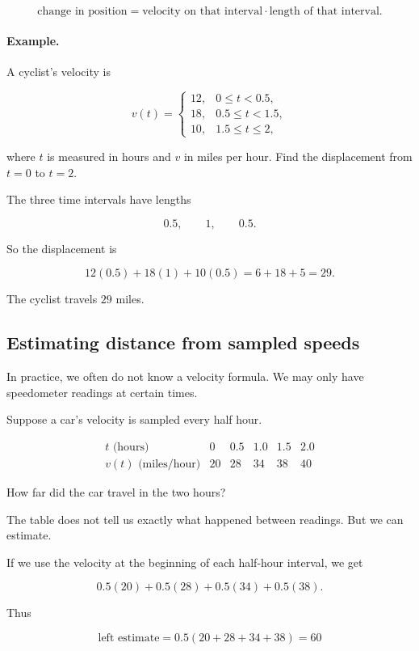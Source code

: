 \[
\text{change in position}
=
\text{velocity on that interval}\cdot\text{length of that interval}.
\]

\paragraph{Example.}
A cyclist's velocity is

\[
v(t)=
\begin{cases}
12, & 0\le t<0.5,\\
18, & 0.5\le t<1.5,\\
10, & 1.5\le t\le 2,
\end{cases}
\]

where \(t\) is measured in hours and \(v\) in miles per hour.  Find the displacement
from \(t=0\) to \(t=2\).

The three time intervals have lengths

\[
0.5,\qquad 1,\qquad 0.5.
\]

So the displacement is

\[
12(0.5)+18(1)+10(0.5)=6+18+5=29.
\]

The cyclist travels \(29\) miles.

\subsection{Estimating distance from sampled speeds}
\label{subsec:estimating-distance-from-sampled-speeds}

In practice, we often do not know a velocity formula.  We may only have speedometer
readings at certain times.

Suppose a car's velocity is sampled every half hour.

\[
\begin{array}{c|ccccc}
t\text{ (hours)} & 0 & 0.5 & 1.0 & 1.5 & 2.0 \\ \hline
v(t)\text{ (miles/hour)} & 20 & 28 & 34 & 38 & 40
\end{array}
\]

How far did the car travel in the two hours?

The table does not tell us exactly what happened between readings.  But we can
estimate.

If we use the velocity at the beginning of each half-hour interval, we get

\[
0.5(20)+0.5(28)+0.5(34)+0.5(38).
\]

Thus

\[
\text{left estimate}
=
0.5(20+28+34+38)
=
60
\]

